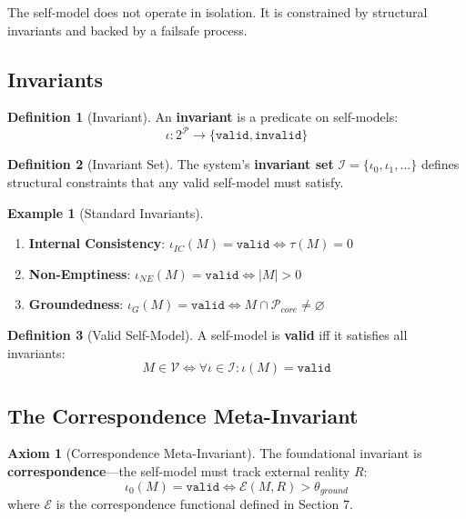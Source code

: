 \documentclass[12pt,a4paper]{article}
\theoremstyle{definition}
\newtheorem{definition}{Definition}[section]
\newtheorem{axiom}{Axiom}[section]
\newtheorem{example}{Example}[section]
\begin{document}
The self-model does not operate in isolation. It is constrained by structural invariants and backed by a failsafe process.

\subsection{Invariants}

\begin{definition}[Invariant]
An \textbf{invariant} is a predicate on self-models:
\[ \iota: 2^{\mathcal{P}} \to \{\texttt{valid}, \texttt{invalid}\} \]
\end{definition}

\begin{definition}[Invariant Set]
The system's \textbf{invariant set} $\mathcal{I} = \{\iota_0, \iota_1, \ldots\}$ defines structural constraints that any valid self-model must satisfy.
\end{definition}

\begin{example}[Standard Invariants]
\begin{enumerate}
    \item \textbf{Internal Consistency}: $\iota_{IC}(M) = \texttt{valid} \iff \tau(M) = 0$
    \item \textbf{Non-Emptiness}: $\iota_{NE}(M) = \texttt{valid} \iff |M| > 0$
    \item \textbf{Groundedness}: $\iota_G(M) = \texttt{valid} \iff M \cap \mathcal{P}_{core} \neq \varnothing$
\end{enumerate}
\end{example}

\begin{definition}[Valid Self-Model]
A self-model is \textbf{valid} iff it satisfies all invariants:
\[ M \in \mathcal{V} \iff \forall \iota \in \mathcal{I}: \iota(M) = \texttt{valid} \]
\end{definition}

\subsection{The Correspondence Meta-Invariant}

\begin{axiom}[Correspondence Meta-Invariant]
The foundational invariant is \textbf{correspondence}---the self-model must track external reality $R$:
\[ \iota_0(M) = \texttt{valid} \iff \mathcal{E}(M, R) > \theta_{ground} \]
where $\mathcal{E}$ is the correspondence functional defined in Section 7.
\end{axiom}
\end{document}
